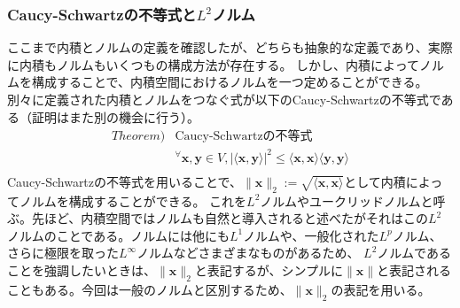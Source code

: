 \documentclass[10pt]{ujarticle}
\begin{document}
\subsubsection{Caucy-Schwartzの不等式と$L^2$ノルム}
ここまで内積とノルムの定義を確認したが、どちらも抽象的な定義であり、実際に内積もノルムもいくつもの構成方法が存在する。
しかし、内積によってノルムを構成することで、内積空間におけるノルムを一つ定めることができる。
別々に定義された内積とノルムをつなぐ式が以下のCaucy-Schwartzの不等式である（証明はまた別の機会に行う）。
$$
\begin{aligned}
  Theorem)&\text{Caucy-Schwartzの不等式}\\
  &^\forall\mathbf{x},\mathbf{y}\in V,|\langle\mathbf{x},\mathbf{y}\rangle|^2\leq\langle\mathbf{x},\mathbf{x}\rangle\langle\mathbf{y},\mathbf{y}\rangle\\
\end{aligned}
$$
Caucy-Schwartzの不等式を用いることで、$\|\mathbf{x}\|_2:=\sqrt{\langle\mathbf{x},\mathbf{x}\rangle}$として内積によってノルムを構成することができる。
これを$L^2$ノルムやユークリッドノルムと呼ぶ。先ほど、内積空間ではノルムも自然と導入されると述べたがそれはこの$L^2$ノルムのことである。ノルムには他にも$L^1$ノルムや、一般化された$L^p$ノルム、さらに極限を取った$L^\infty$ノルムなどさまざまなものがあるため、
$L^2$ノルムであることを強調したいときは、$\|\mathbf{x}\|_2$と表記するが、シンプルに$\|\mathbf{x}\|$と表記されることもある。今回は一般のノルムと区別するため、$\|\mathbf{x}\|_2$の表記を用いる。
\end{document}
